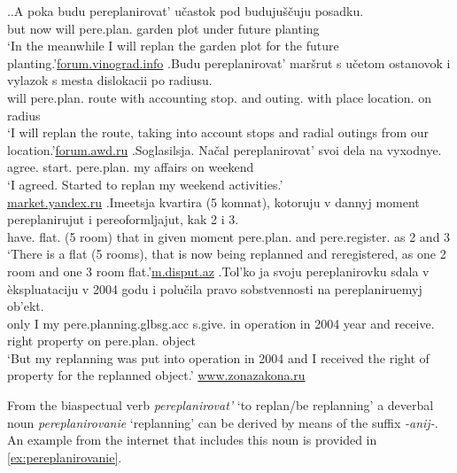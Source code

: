 \ex.\label{ex:pereplanirovat:imperf}\ag.\label{ex:pereplanirovat:future1}A poka budu pereplanirovat'\textsuperscript{\IPF} u\v{c}astok pod buduju\v{s}\v{c}uju posadku.\\
but now will pere.plan. {garden plot} under future planting\\
\trans `In the meanwhile I will replan the garden plot for the future planting.'\hbox{}\hfill\hbox{\url{forum.vinograd.info}}
\bg.\label{ex:pereplanirovat:future2}Budu pereplanirovat' mar\v{s}rut s u\v{c}etom ostanovok i vylazok s mesta dislokacii po radiusu.\\
will pere.plan. route with accounting stop. and outing. with place location. on radius\\
\trans `I will replan the route, taking into account stops and radial outings from our location.'\hbox{}\hfill\hbox{\url{forum.awd.ru}}
\bg.\label{ex:pereplanirovat:start}Soglasilsja. Na\v{c}al pereplanirovat' svoi dela na vyxodnye.\\
agree. start. pere.plan. my affairs on weekend\\
\trans `I agreed. Started to replan my weekend activities.'\\\hbox{}\hfill\hbox{\url{market.yandex.ru}}
\bg.\label{ex:pereplanirovat:prog}Imeetsja kvartira (5 komnat), kotoruju v dannyj moment pereplanirujut i pereoformljajut, kak 2 i 3.\\
have. flat. (5 room) that in given moment pere.plan. and pere.register. as 2 and 3\\
\trans `There is a flat (5 rooms), that is now being replanned and reregistered, as one 2 room and one 3 room flat.'\hbox{}\hfill\hbox{\url{m.disput.az}}
\bg.\label{ex:pereplanirovat:part}Tol'ko ja svoju pereplanirovku sdala v \`{e}kspluataciju v 2004 godu i polu\v{c}ila pravo sobstvennosti na pereplaniruemyj ob'ekt.\\
only I my pere.planning.glb{sg.acc} s.give. in operation in 2004 year and receive. right property on pere.plan. object\\
`But my replanning was put into operation in 2004 and I received the right of property for the replanned object.'
\hbox{}\hfill\hbox{\url{www.zonazakona.ru}}

From the biaspectual verb \textit{pereplanirovat'} `to replan/be replanning' a deverbal noun \textit{pereplanirovanie} `replanning' can be derived by means of the suffix \textit{-anij-}. An example from the internet that includes this noun is provided in \ref{ex:pereplanirovanie}.

